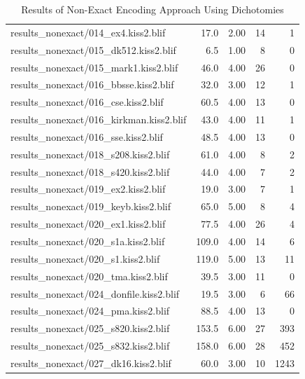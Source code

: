 \begin{table}[h]
\begin{tabular}{|l|r|r|r|r|}
results\_nonexact/014\_ex4.kiss2.blif & 17.0 & 2.00 & 14 & 1 \\
results\_nonexact/015\_dk512.kiss2.blif & 6.5 & 1.00 & 8 & 0 \\
results\_nonexact/015\_mark1.kiss2.blif & 46.0 & 4.00 & 26 & 0 \\
results\_nonexact/016\_bbsse.kiss2.blif & 32.0 & 3.00 & 12 & 1 \\
results\_nonexact/016\_cse.kiss2.blif & 60.5 & 4.00 & 13 & 0 \\
results\_nonexact/016\_kirkman.kiss2.blif & 43.0 & 4.00 & 11 & 1 \\
results\_nonexact/016\_sse.kiss2.blif & 48.5 & 4.00 & 13 & 0 \\
results\_nonexact/018\_s208.kiss2.blif & 61.0 & 4.00 & 8 & 2 \\
results\_nonexact/018\_s420.kiss2.blif & 44.0 & 4.00 & 7 & 2 \\
results\_nonexact/019\_ex2.kiss2.blif & 19.0 & 3.00 & 7 & 1 \\
results\_nonexact/019\_keyb.kiss2.blif & 65.0 & 5.00 & 8 & 4 \\
results\_nonexact/020\_ex1.kiss2.blif & 77.5 & 4.00 & 26 & 4 \\
results\_nonexact/020\_s1a.kiss2.blif & 109.0 & 4.00 & 14 & 6 \\
results\_nonexact/020\_s1.kiss2.blif & 119.0 & 5.00 & 13 & 11 \\
results\_nonexact/020\_tma.kiss2.blif & 39.5 & 3.00 & 11 & 0 \\
results\_nonexact/024\_donfile.kiss2.blif & 19.5 & 3.00 & 6 & 66 \\
results\_nonexact/024\_pma.kiss2.blif & 88.5 & 4.00 & 13 & 0 \\
results\_nonexact/025\_s820.kiss2.blif & 153.5 & 6.00 & 27 & 393 \\
results\_nonexact/025\_s832.kiss2.blif & 158.0 & 6.00 & 28 & 452 \\
results\_nonexact/027\_dk16.kiss2.blif & 60.0 & 3.00 & 10 & 1243 \\
		\hline
	\end{tabular}
	\caption{Results of Non-Exact Encoding Approach Using Dichotomies}
\end{table}

